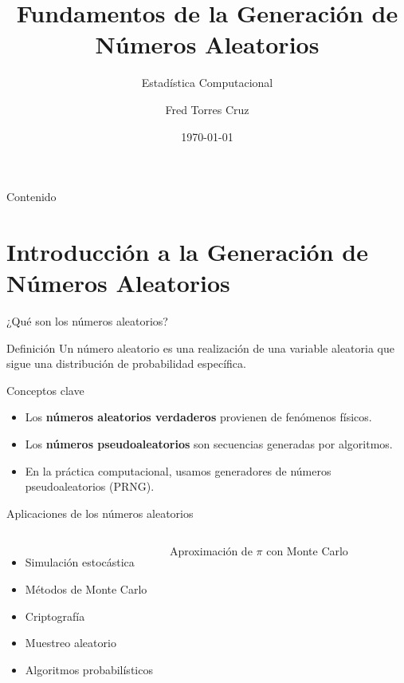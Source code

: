 \documentclass[aspectratio=169]{beamer}
\title{Fundamentos de la Generación de Números Aleatorios}
\subtitle{Estadística Computacional}
\author{Fred Torres Cruz}
\date{\today}
\begin{document}
\begin{frame}
    \titlepage
\end{frame}

\begin{frame}{Contenido}
    \tableofcontents
\end{frame}

\section{Introducción a la Generación de Números Aleatorios}

\begin{frame}{¿Qué son los números aleatorios?}
    \begin{block}{Definición}
        Un número aleatorio es una realización de una variable aleatoria que sigue una distribución de probabilidad específica.
    \end{block}
    
    \bigskip
    
    \begin{alertblock}{Conceptos clave}
        \begin{itemize}
            \item Los \textbf{números aleatorios verdaderos} provienen de fenómenos físicos.
            \item Los \textbf{números pseudoaleatorios} son secuencias generadas por algoritmos.
            \item En la práctica computacional, usamos generadores de números pseudoaleatorios (PRNG).
        \end{itemize}
    \end{alertblock}
\end{frame}

\begin{frame}{Aplicaciones de los números aleatorios}
    \begin{columns}
        \begin{itemize}
            \item Simulación estocástica
            \item Métodos de Monte Carlo
            \item Criptografía
            \item Muestreo aleatorio
            \item Algoritmos probabilísticos
        \end{itemize}
        
        \centering
        \tiny Aproximación de $\pi$ con Monte Carlo
    \end{columns}
\end{frame}
\end{document}
